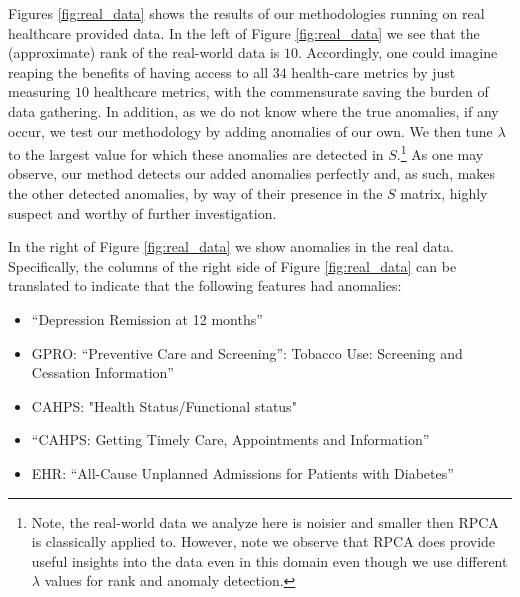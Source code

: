 \documentclass[conference]{IEEEtran}
\begin{document}
Figures \ref{fig:real_data} shows the results of our methodologies running on real healthcare provided data.  In the left of Figure \ref{fig:real_data} we see that the (approximate) rank of the real-world data is $10$.   Accordingly, one could imagine reaping the benefits of having access to all $34$ health-care metrics by just measuring $10$ healthcare metrics, with the commensurate saving the burden of data gathering.  In addition, as we do not know where the true anomalies, if any occur, we test our methodology by adding anomalies of our own.  We then tune $\lambda$ to the largest value for which these anomalies are detected in $S$.\footnote{Note, the real-world data we analyze here is noisier and smaller then RPCA is classically applied to.  However, note we observe that RPCA does provide useful insights into the data even in this domain even though we use different $\lambda$ values for rank and anomaly detection.} As one may observe, our method detects our added anomalies perfectly and, as such, makes the other detected anomalies, by way of their presence in the $S$ matrix, highly suspect and worthy of further investigation.   

In the right of Figure \ref {fig:real_data}
we show anomalies in the real data.  Specifically, the columns of the right side of Figure \ref {fig:real_data} can be translated to indicate that the following features had anomalies: 

\begin{itemize}
\item 
“Depression Remission at 12 months”

\item 
GPRO: “Preventive Care and Screening”: Tobacco Use: Screening and Cessation Information”  %

\item 
CAHPS: "Health Status/Functional status"
\item 
“CAHPS: Getting Timely Care, Appointments and Information”

\item 
EHR: “All-Cause Unplanned Admissions for Patients with Diabetes”
\end{itemize}
\end{document}
